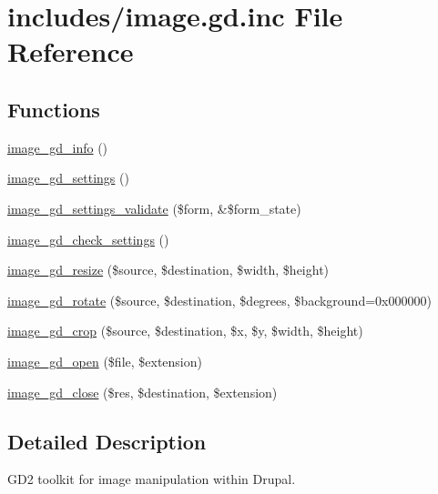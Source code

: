 \hypertarget{image_8gd_8inc}{
\section{includes/image.gd.inc File Reference}
\label{image_8gd_8inc}
}
\subsection*{Functions}
\begin{Indent}{\bf }\par
\begin{CompactItemize}
\item 
\hyperlink{group__image_g7d5a8bb446703a5cea5524df48af65e1}{image\_\-gd\_\-info} ()
\item 
\hyperlink{group__image_g2a492c31e41c59af2b7e976e28886b15}{image\_\-gd\_\-settings} ()
\item 
\hyperlink{group__image_gab4f4ec4e8bc9abc51939a4194848fbb}{image\_\-gd\_\-settings\_\-validate} (\$form, \&\$form\_\-state)
\item 
\hyperlink{group__image_g1926e8b1932480b81427c1301e8eb4dc}{image\_\-gd\_\-check\_\-settings} ()
\item 
\hyperlink{group__image_g0277cb4fc23069a240a2438a97b079ff}{image\_\-gd\_\-resize} (\$source, \$destination, \$width, \$height)
\item 
\hyperlink{group__image_gce49547cf14336f64e2fdeb47c8ce440}{image\_\-gd\_\-rotate} (\$source, \$destination, \$degrees, \$background=0x000000)
\item 
\hyperlink{group__image_gcebe63cdcfcb41f3896fc16a128dde75}{image\_\-gd\_\-crop} (\$source, \$destination, \$x, \$y, \$width, \$height)
\item 
\hyperlink{group__image_gbb45a7fb30f1066896d524d9b4069622}{image\_\-gd\_\-open} (\$file, \$extension)
\item 
\hyperlink{group__image_ga23594d3a02ab3e49647cb33f1e8590f}{image\_\-gd\_\-close} (\$res, \$destination, \$extension)
\end{CompactItemize}
\end{Indent}


\subsection{Detailed Description}
GD2 toolkit for image manipulation within Drupal. 